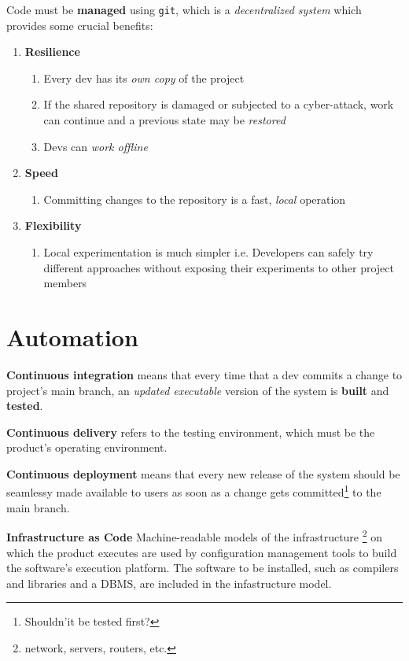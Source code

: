 Code must be \textbf{managed} using \texttt{git}, which is a \textit{decentralized system} which provides some crucial benefits:
\begin{enumerate}
   \item \textbf{Resilience}
   \begin{enumerate}
      \item Every dev has its \textit{own copy} of the project
      \item If the shared repository is damaged or subjected to a cyber-attack, work can continue and a previous state may be \textit{restored}
      \item Devs can \textit{work offline}
   \end{enumerate}
   \item \textbf{Speed}
   \begin{enumerate}
      \item Committing changes to the repository is a fast, \textit{local} operation
   \end{enumerate}
   \item \textbf{Flexibility}
   \begin{enumerate}
      \item Local experimentation is much simpler i.e. 
      Developers can safely try different approaches without exposing their experiments to other project members
   \end{enumerate}
\end{enumerate}

\section{Automation}

\textbf{Continuous integration} means that every time that a dev commits a change to project's main branch, 
an \textit{updated executable} version of the system is \textbf{built} and \textbf{tested}.

\textbf{Continuous delivery} refers to the testing environment, which must be the product's operating environment.

\textbf{Continuous deployment} means that every new release of the system should be seamlessy made available to users as soon as a change gets committed\footnote{Shouldn'it be tested first? \smiley} to the main branch.

\textbf{Infrastructure as Code}
Machine-readable models of the infrastructure \footnote{network, servers, routers, etc.} on which the product executes
are used by configuration management tools to build the
software’s execution platform. The software to be installed,
such as compilers and libraries and a DBMS, are included in the infastructure model.